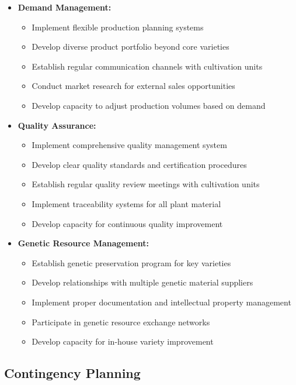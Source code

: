 \begin{itemize}
    \item \textbf{Demand Management:}
    \begin{itemize}
        \item Implement flexible production planning systems
        \item Develop diverse product portfolio beyond core varieties
        \item Establish regular communication channels with cultivation units
        \item Conduct market research for external sales opportunities
        \item Develop capacity to adjust production volumes based on demand
    \end{itemize}
    
    \item \textbf{Quality Assurance:}
    \begin{itemize}
        \item Implement comprehensive quality management system
        \item Develop clear quality standards and certification procedures
        \item Establish regular quality review meetings with cultivation units
        \item Implement traceability systems for all plant material
        \item Develop capacity for continuous quality improvement
    \end{itemize}
    
    \item \textbf{Genetic Resource Management:}
    \begin{itemize}
        \item Establish genetic preservation program for key varieties
        \item Develop relationships with multiple genetic material suppliers
        \item Implement proper documentation and intellectual property management
        \item Participate in genetic resource exchange networks
        \item Develop capacity for in-house variety improvement
    \end{itemize}
\end{itemize}

\subsection{Contingency Planning}

